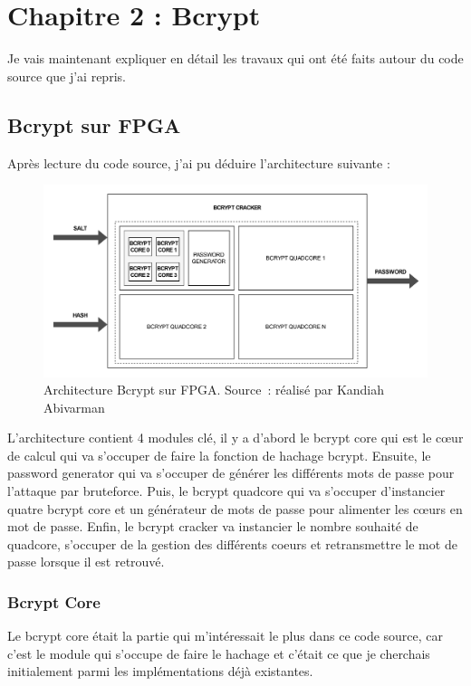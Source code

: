 \chapter{Chapitre 2 : Bcrypt}

Je vais maintenant expliquer en détail les travaux qui ont été faits autour du code source que j'ai repris.

\section{Bcrypt sur FPGA}

Après lecture du code source, j'ai pu déduire l'architecture suivante :

\begin{figure}[tbph!]
	\centering
	\includegraphics[width=0.9\linewidth]{bcrypt_architecture}
	\caption[Architecture Bcrypt sur FPGA]{Architecture Bcrypt sur FPGA. Source : réalisé par Kandiah Abivarman}
	\label{fig:bcrypt_architecture}
\end{figure}

L'architecture contient 4 modules clé, il y a d'abord le bcrypt core qui est le cœur de calcul qui va s'occuper de faire la fonction de hachage bcrypt. 
Ensuite, le password generator qui va s'occuper de générer les différents mots de passe pour l'attaque par bruteforce. 
Puis, le bcrypt quadcore qui va s'occuper d'instancier quatre bcrypt core et un générateur de mots de passe pour alimenter les cœurs en mot de passe. 
Enfin, le bcrypt cracker va instancier le nombre souhaité de quadcore, s'occuper de la gestion des différents coeurs et retransmettre le mot de passe lorsque il est retrouvé.

\subsection{Bcrypt Core}

Le bcrypt core était la partie qui m'intéressait le plus dans ce code source, car c'est le module qui s'occupe de faire le hachage et c'était ce que je cherchais initialement parmi les implémentations déjà existantes.

